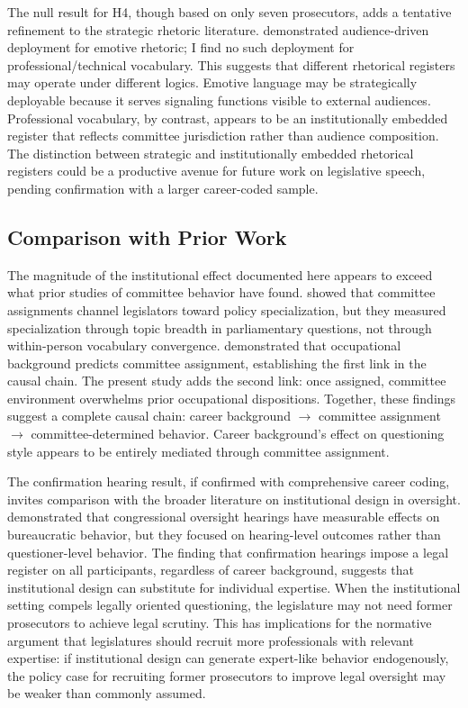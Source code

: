 \documentclass[11pt]{article}
\begin{document}
The null result for H4, though based on only seven prosecutors, adds a tentative refinement to the strategic rhetoric literature. \citet{osnabrugge2021} demonstrated audience-driven deployment for emotive rhetoric; I find no such deployment for professional/technical vocabulary. This suggests that different rhetorical registers may operate under different logics. Emotive language may be strategically deployable because it serves signaling functions visible to external audiences. Professional vocabulary, by contrast, appears to be an institutionally embedded register that reflects committee jurisdiction rather than audience composition. The distinction between strategic and institutionally embedded rhetorical registers could be a productive avenue for future work on legislative speech, pending confirmation with a larger career-coded sample.

\subsection{Comparison with Prior Work}

The magnitude of the institutional effect documented here appears to exceed what prior studies of committee behavior have found. \citet{martinez2022} showed that committee assignments channel legislators toward policy specialization, but they measured specialization through topic breadth in parliamentary questions, not through within-person vocabulary convergence. \citet{mickler2017} demonstrated that occupational background predicts committee assignment, establishing the first link in the causal chain. The present study adds the second link: once assigned, committee environment overwhelms prior occupational dispositions. Together, these findings suggest a complete causal chain: career background $\rightarrow$ committee assignment $\rightarrow$ committee-determined behavior. Career background's effect on questioning style appears to be entirely mediated through committee assignment.

The confirmation hearing result, if confirmed with comprehensive career coding, invites comparison with the broader literature on institutional design in oversight. \citet{ban2025} demonstrated that congressional oversight hearings have measurable effects on bureaucratic behavior, but they focused on hearing-level outcomes rather than questioner-level behavior. The finding that confirmation hearings impose a legal register on all participants, regardless of career background, suggests that institutional design can substitute for individual expertise. When the institutional setting compels legally oriented questioning, the legislature may not need former prosecutors to achieve legal scrutiny. This has implications for the normative argument that legislatures should recruit more professionals with relevant expertise: if institutional design can generate expert-like behavior endogenously, the policy case for recruiting former prosecutors to improve legal oversight may be weaker than commonly assumed.
\end{document}

